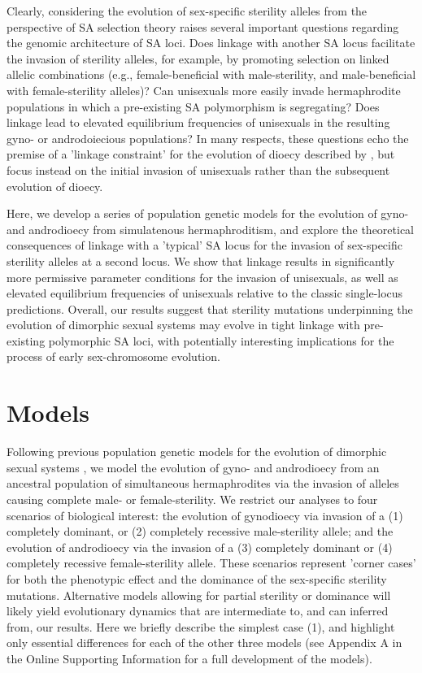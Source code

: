 \documentclass[9pt,twocolumn,twoside,lineno]{gsajnl}
\begin{document}
Clearly, considering the evolution of sex-specific sterility alleles from the perspective of SA selection theory raises several important questions regarding the genomic architecture of SA loci. Does linkage with another SA locus facilitate the invasion of sterility alleles, for example, by promoting selection on linked allelic combinations (e.g., female-beneficial with male-sterility, and male-beneficial with female-sterility alleles)? Can unisexuals more easily invade hermaphrodite populations in which a pre-existing SA polymorphism is segregating? Does linkage lead to elevated equilibrium frequencies of unisexuals in the resulting gyno- or androdoiecious populations? In many respects, these questions echo the premise of a 'linkage constraint' for the evolution of dioecy described by \citet{Charlesworth1978a}, but focus instead on the initial invasion of unisexuals rather than the subsequent evolution of dioecy. 

Here, we develop a series of population genetic models for the evolution of gyno- and androdioecy from simulatenous hermaphroditism, and explore the theoretical consequences of linkage with a 'typical' SA locus for the invasion of sex-specific sterility alleles at a second locus. We show that linkage results in significantly more permissive parameter conditions for the invasion of unisexuals, as well as elevated equilibrium frequencies of unisexuals relative to the classic single-locus predictions. Overall, our results suggest that sterility mutations underpinning the evolution of dimorphic sexual systems may evolve in tight linkage with pre-existing polymorphic SA loci, with potentially interesting implications for the process of early sex-chromosome evolution.


\section{Models}
\label{sec:methods}

Following previous population genetic models for the evolution of dimorphic sexual systems \citep{Charlesworth1978a}, we model the evolution of gyno- and androdioecy from an ancestral population of simultaneous hermaphrodites via the invasion of alleles causing complete male- or female-sterility. We restrict our analyses to four scenarios of biological interest: the evolution of gynodioecy via invasion of a (1) completely dominant, or (2) completely recessive male-sterility allele; and the evolution of androdioecy via the invasion of a (3) completely dominant or (4) completely recessive female-sterility allele. These scenarios represent 'corner cases' for both the phenotypic effect and the dominance of the sex-specific sterility mutations. Alternative models allowing for partial sterility or dominance will likely yield evolutionary dynamics that are intermediate to, and can inferred from, our results. Here we briefly describe the simplest case (1), and highlight only essential differences for each of the other three models (see Appendix A in the Online Supporting Information for a full development of the models). 
\end{document}
